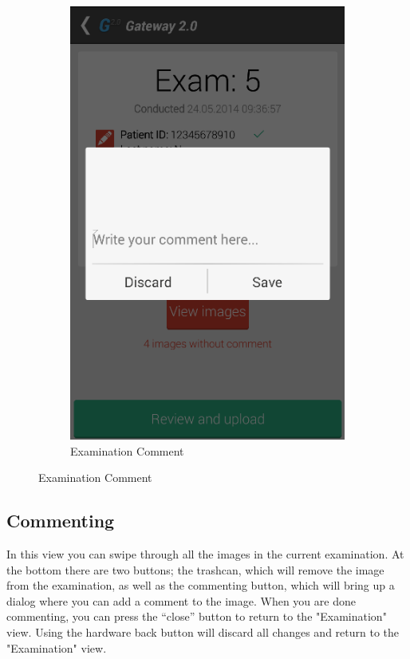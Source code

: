 \begin{figure}[H]
    \begin{subfigure}[b]{0.49\textwidth}
        \includegraphics[width=\textwidth]{img/interface/5-ExaminationComment.png}
        \caption*{Examination Comment}
        \label{fig:05examinationcomment}
    \end{subfigure}
\end{figure}

\newpage
\subsection*{Commenting}
In this view you can swipe through all the images in the current examination. At the bottom there are two buttons; the trashcan, which will remove the image from the examination, as well as the commenting button, which will bring up a dialog where you can add a comment to the image. When you are done commenting, you can press the “close” button to return to the "Examination" view. Using the hardware back button will discard all changes and return to the "Examination" view.

